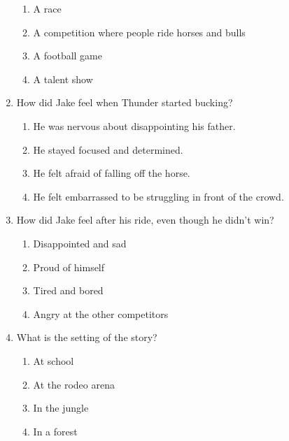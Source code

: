 \documentclass[12pt]{article}
\begin{document}
\begin{enumerate}
    \begin{enumerate}[label=\Alph*.]
        \item A race
        \item A competition where people ride horses and bulls
        \item A football game
        \item A talent show
    \end{enumerate}

    \vspace{0.5cm}

    \item How did Jake feel when Thunder started bucking?

    \begin{enumerate}[label=\Alph*.]
        \item He was nervous about disappointing his father.
        \item He stayed focused and determined.
        \item He felt afraid of falling off the horse.
        \item He felt embarrassed to be struggling in front of the crowd.
    \end{enumerate}

    \vspace{0.5cm}

    \item How did Jake feel after his ride, even though he didn’t win?

    \begin{enumerate}[label=\Alph*.]
        \item Disappointed and sad
        \item Proud of himself
        \item Tired and bored
        \item Angry at the other competitors
    \end{enumerate}

    \vspace{0.5cm}

    \item What is the setting of the story?

    \begin{enumerate}[label=\Alph*.]
        \item At school
        \item At the rodeo arena
        \item In the jungle
        \item In a forest
    \end{enumerate}


\end{enumerate}
\end{document}
